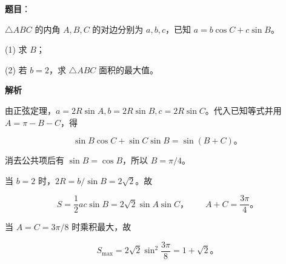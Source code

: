 \begin{answer}

\textbf{题目}：

$\triangle ABC$ 的内角 $A,B,C$ 的对边分别为 $a,b,c$，已知 $a=b\cos C+c\sin B$。

(1) 求 $B$；

(2) 若 $b=2$，求 $\triangle ABC$ 面积的最大值。

\textbf{解析}


由正弦定理，$a=2R\sin A,b=2R\sin B,c=2R\sin C$。代入已知等式并用 $A=\pi-B-C$，得

\nopagebreak[4]
\[\sin B\cos C+\sin C\sin B=\sin(B+C)\text{。}\]

消去公共项后有 $\sin B=\cos B$，所以 $B=\pi/4$。


当 $b=2$ 时，$2R=b/\sin B=2\sqrt2$。故

\nopagebreak[4]
\[S=\frac12ac\sin B=2\sqrt2\sin A\sin C\text{，}\qquad A+C=\frac{3\pi}4\text{。}\]

当 $A=C=3\pi/8$ 时乘积最大，故

\nopagebreak[4]
\[S_{\max}=2\sqrt2\sin^2\frac{3\pi}8=1+\sqrt2\text{。}\]



\end{answer}
